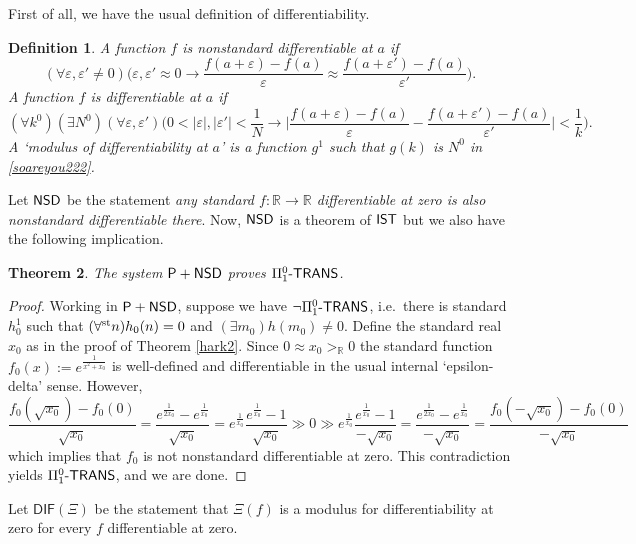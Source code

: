 \documentclass[reqno]{amsart}
\newtheorem{thm}{Theorem}
\newtheorem{defi}[thm]{Definition}
\def\bdefi{\begin{defi}\rm}
\def\edefi{\end{defi}}
\def\P{\textup{\textsf{P}}}
\def\R{{\mathbb  R}}
\def\R{{\mathbb{R}}}
\def\st{\textup{st}}
\def\di{\rightarrow}
\def\eps{\varepsilon}
\def\paai{\Pi_{1}^{0}\textup{-\textsf{TRANS}}}
\def\IST{\textup{\textsf{IST}}}
\def\NSD{\textup{\textsf{NSD}}}
\numberwithin{equation}{section}
\numberwithin{thm}{section}
\begin{document}
First of all, we have the usual definition of differentiability.  
\bdefi A function $f$ is \emph{nonstandard differentiable} at $a$ if
\begin{equation}\label{soareyou22}\textstyle
(\forall \eps, \eps' \ne0)\big(\eps, \eps'\approx 0 \di \frac{f(a+\eps)-f(a)}{\eps}\approx \frac{f(a+\eps')-f(a)}{\eps'}\big).
\end{equation}
A function $f$ is \emph{differentiable} at $a$ if
\begin{equation}\label{soareyou222}\textstyle
(\forall k^{0})(\exists N^{0})(\forall \eps, \eps')\big(0<|\eps|, |\eps'|<\frac{1}{N} \di
 \big|\frac{f(a+\eps)-f(a)}{\eps}- \frac{f(a+\eps')-f(a)}{\eps'}\big|<\frac1k\big).
\end{equation}
A `modulus of differentiability at $a$' is a function $g^{1}$ such that $g(k)$ is $N^{0}$ in \eqref{soareyou222}.  
\edefi
Let $\NSD$ be the statement \emph{any standard $f:\R\di \R$ differentiable at zero is also {nonstandard differentiable} there}.  %
Now, $\NSD$ is a theorem of $\IST$ but we also have the following implication.  
\begin{thm}\label{hark3} 
The system $\P+\NSD$ proves $\paai$.  
\end{thm}
\begin{proof}
Working in $\P+\NSD$, suppose we have $\neg\paai$, i.e.\ there is standard $h_{0}^{1}$ such that $(\forall^{\st}n)h_{0}(n)=0$ and $(\exists m_{0})h(m_{0})\ne0$.  
Define the standard real $x_{0}$ as in the proof of Theorem \ref{hark2}.  Since $0\approx x_{0}>_{\R}0$ the standard function $f_{0}(x):=e^{\frac{1}{x^{2}+x_{0}}}$ is well-defined and differentiable in the usual internal `epsilon-delta' sense.  However, 
\[\textstyle
\frac{f_{0}(\sqrt{x_{0}})-f_{0}(0)}{\sqrt{x_{0}}}= \frac{e^{\frac{1}{2x_{0}}}-e^{\frac{1}{x_{0}}}}{\sqrt{x_{0}}}= e^{\frac{1}{x_{0}}}\frac{e^{\frac{1}{x_{0}}}-1}{\sqrt{x_{0}}}\gg 0 \gg  e^{\frac{1}{x_{0}}}\frac{e^{\frac{1}{x_{0}}}-1}{-\sqrt{x_{0}}}  =\frac{e^{\frac{1}{2x_{0}}}-e^{\frac{1}{x_{0}}}}{-\sqrt{x_{0}}}=\frac{f_{0}(-\sqrt{x_{0}})-f_{0}(0)}{-\sqrt{x_{0}}}
\]
which implies that $f_{0}$ is not nonstandard differentiable at zero.  
This contradiction yields $\paai$, and we are done.        
\end{proof}
Let $\textsf{DIF}(\Xi)$ be the statement that $\Xi(f)$ is a modulus for differentiability at zero for every $f$ differentiable at zero.  
\end{document}
